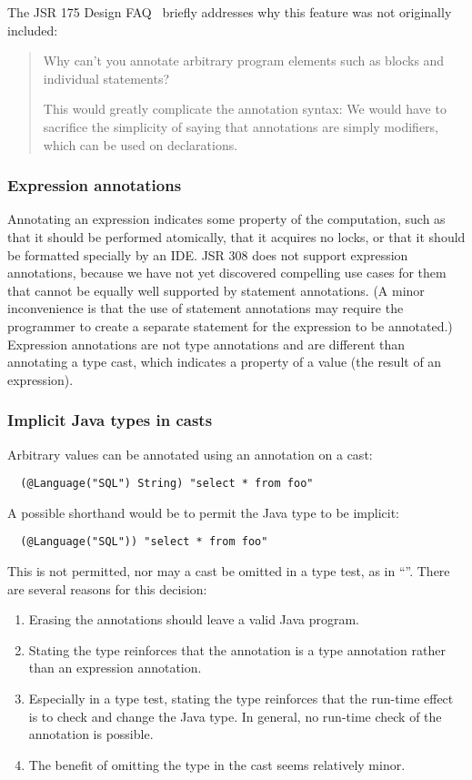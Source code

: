 \documentclass[10pt]{article}
\begin{document}
The JSR 175 Design FAQ~\cite{JSR175-PFD2} briefly addresses why this
feature was not originally included:

\begin{quote}
  Why can't you annotate arbitrary program elements such as blocks
    and individual statements?

  This would greatly complicate the annotation syntax: We would have to
  sacrifice the simplicity of saying that annotations are simply modifiers,
  which can be used on declarations.
\end{quote}


\subsubsection{Expression annotations\label{expression-annotations}}

Annotating an expression
indicates some property of the computation, such as that it should
be performed atomically, that it acquires no locks, or that it should be
formatted specially by an IDE\@.  JSR 308 does not support expression
annotations, because we have not yet discovered compelling use cases for
them that cannot be equally well supported by statement annotations.  (A
minor inconvenience is that the use of statement annotations may require
the programmer to create a separate statement for the expression to be
annotated.)
Expression annotations are not type annotations and are different than
annotating a type cast, which indicates a property of a value (the result
of an expression).


\subsubsection{Implicit Java types in casts\label{implicit-java-types-in-casts}}

Arbitrary values can be annotated using an annotation on a cast:
\begin{Verbatim}
  (@Language("SQL") String) "select * from foo"
\end{Verbatim}

A possible shorthand would be to permit the Java type to be implicit:
\begin{Verbatim}
  (@Language("SQL")) "select * from foo"
\end{Verbatim}
This is not permitted, nor may a cast be omitted in a type test, as in
``''.  There are several reasons for this
decision:
\begin{enumerate}
\item Erasing the annotations should leave a valid Java program.
\item Stating the type reinforces that the annotation is a
type annotation rather than an expression annotation.
\item Especially in a type test, stating the type reinforces that the run-time
effect is to check and change the Java type.  In general, no run-time check
of the annotation is possible.
\item The benefit of omitting the type in the cast seems relatively minor.
\end{enumerate}
\end{document}
